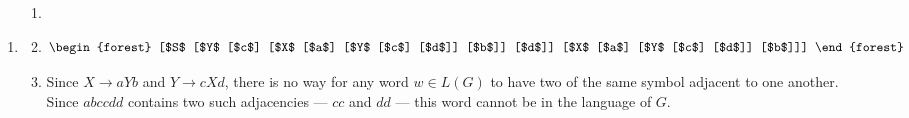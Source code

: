 \documentclass[12pt,a4paper]{article}
\begin{document}
\begin{enumerate}
  \item %
  \begin{enumerate}
    \item %
    \begin{enumerate}
    \end{enumerate}

    \item %
    \begin{align*}
    \begin{forest}
    [$S$ [$Y$ [$c$]
              [$X$ [$a$]
                   [$Y$ [$c$]
                        [$d$]]
                   [$b$]]
                     [$d$]]
         [$X$ [$a$]
              [$Y$ [$c$]
                   [$d$]]
              [$b$]]]
    \end{forest}
    \end{align*}

    \item %
      Since $X \rightarrow aYb$ and $Y \rightarrow cXd$, there is no way for
      any word $w \in L(G)$ to have two of the same symbol adjacent to one
      another. \\
      Since $abccdd$ contains two such adjacencies --- $cc$ and $dd$ --- this
      word cannot be in the language of $G$.
  \end{enumerate}


\end{enumerate}
\end{document}
